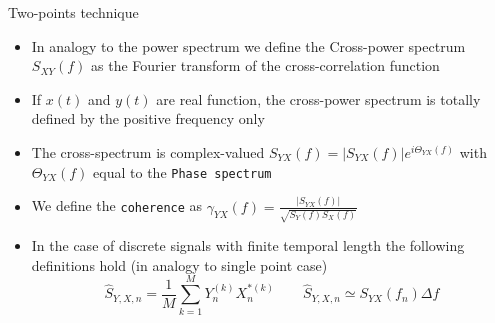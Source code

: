 \documentclass[t,10pt]{beamer}
\begin{document}
\begin{frame}{Two-points technique}
\begin{itemize}[<+->]
\item In analogy to the power spectrum we define the
  \textcolor{tascarletred}{Cross-power spectrum $S_{XY}(f)$} as the
  Fourier transform of the cross-correlation function
\item If $x(t)$ and $y(t)$ are real
  function, the cross-power spectrum is totally defined by the
  positive frequency only
\item The cross-spectrum is
  complex-valued $S_{YX}(f)=|S_{YX}(f)|e^{i\Theta_{YX}(f)}$ with
  $\Theta_{YX}(f)$ equal to the \textcolor{tascarletred}{\texttt{Phase
    spectrum}}
\item We define the
  \textcolor{tascarletred}{\texttt{coherence}} as $\gamma_{YX}(f)=\frac{|S_{YX}(f)|}{\sqrt{S_Y(f)S_X(f)}}$
\item In the case of discrete signals with finite temporal length the following definitions hold
  (in analogy to single point case)
\begin{equation*}
\hat{S}_{Y,X,n}= \frac{1}{M}\sum_{k=1}^MY_n^{(k)}X_n^{*(k)} \qquad
\hat{S}_{Y,X,n}\simeq S_{YX}(f_n)\Delta f
\end{equation*}
\end{itemize}
\end{frame}
\end{document}
